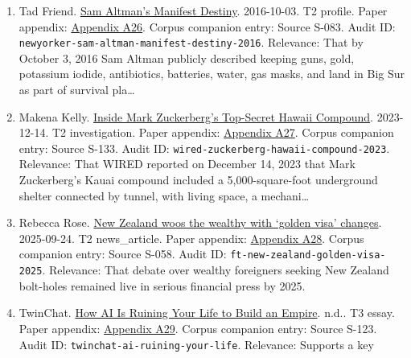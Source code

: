 \documentclass[
  american,
  11pt,
  letterpaper,
]{article}
\begin{document}
\begin{enumerate}
  \hyperref[ch-10-appendix-a25-ftc-opens-inquiry-into-big-tech-s-partnerships-with-leading-ai-startups]{Appendix
  A25}. Corpus companion entry: Source S-010. Audit ID:
  \texttt{ap-ftc-ai-partnerships-inquiry-2024}. Relevance: That formal
  competition scrutiny of frontier-AI partnerships was already underway
  in the United States by January 2024.
\item
  Tad Friend.
  \href{https://www.newyorker.com/magazine/2016/10/10/sam-altmans-manifest-destiny}{Sam
  Altman's Manifest Destiny}. 2016-10-03. T2 profile. Paper appendix:
  \hyperref[ch-10-appendix-a26-sam-altman-s-manifest-destiny]{Appendix
  A26}. Corpus companion entry: Source S-083. Audit ID:
  \texttt{newyorker-sam-altman-manifest-destiny-2016}. Relevance: That
  by October 3, 2016 Sam Altman publicly described keeping guns, gold,
  potassium iodide, antibiotics, batteries, water, gas masks, and land
  in Big Sur as part of survival pla\ldots{}
\item
  Makena Kelly.
  \href{https://www.wired.com/story/mark-zuckerberg-inside-hawaii-compound}{Inside
  Mark Zuckerberg's Top-Secret Hawaii Compound}. 2023-12-14. T2
  investigation. Paper appendix:
  \hyperref[ch-10-appendix-a27-inside-mark-zuckerbergs-top-secret-hawaii-compound]{Appendix
  A27}. Corpus companion entry: Source S-133. Audit ID:
  \texttt{wired-zuckerberg-hawaii-compound-2023}. Relevance: That WIRED
  reported on December 14, 2023 that Mark Zuckerberg's Kauai compound
  included a 5,000-square-foot underground shelter connected by tunnel,
  with living space, a mechani\ldots{}
\item
  Rebecca Rose.
  \href{https://www.ft.com/content/76ca455c-3b16-4413-8738-3f17431d125b}{New
  Zealand woos the wealthy with `golden visa' changes}. 2025-09-24. T2
  news\_article. Paper appendix:
  \hyperref[ch-10-appendix-a28-new-zealand-woos-the-wealthy-with-golden-visa-changes]{Appendix
  A28}. Corpus companion entry: Source S-058. Audit ID:
  \texttt{ft-new-zealand-golden-visa-2025}. Relevance: That debate over
  wealthy foreigners seeking New Zealand bolt-holes remained live in
  serious financial press by 2025.
\item
  TwinChat.
  \href{https://medium.com/twinchat/how-ai-is-ruining-your-life-to-build-an-empire-8b6d02e55bc9}{How
  AI Is Ruining Your Life to Build an Empire}. n.d.. T3 essay. Paper
  appendix:
  \hyperref[ch-10-appendix-a29-how-ai-is-ruining-your-life-to-build-an-empire]{Appendix
  A29}. Corpus companion entry: Source S-123. Audit ID:
  \texttt{twinchat-ai-ruining-your-life}. Relevance: Supports a key

\end{enumerate}
\end{document}

